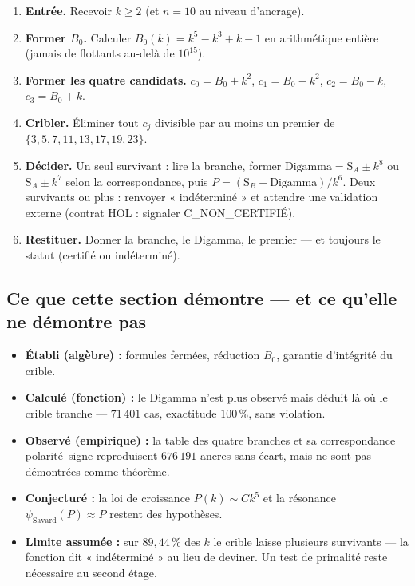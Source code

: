 \documentclass[11pt,a4paper]{article}
\newcommand{\SA}{\mathrm{S}_A}
\newcommand{\SB}{\mathrm{S}_B}
\begin{document}
\begin{enumerate}[leftmargin=*]
  \item \textbf{Entrée.} Recevoir $k \ge 2$ (et $n = 10$ au niveau d'ancrage).
  \item \textbf{Former $B_0$.} Calculer $B_0(k) = k^5-k^3+k-1$ en
    arithmétique entière (jamais de flottants au-delà de $10^{15}$).
  \item \textbf{Former les quatre candidats.}
    $c_0 = B_0+k^2$, $c_1 = B_0-k^2$, $c_2 = B_0-k$, $c_3 = B_0+k$.
  \item \textbf{Cribler.} Éliminer tout $c_j$ divisible par au moins un
    premier de $\{3,5,7,11,13,17,19,23\}$.
  \item \textbf{Décider.} Un seul survivant : lire la branche, former
    $\mathrm{Digamma} = \SA \pm k^8$ ou $\SA \pm k^7$ selon la
    correspondance, puis $P = (\SB-\mathrm{Digamma})/k^6$.
    Deux survivants ou plus : renvoyer « indéterminé » et attendre une
    validation externe (contrat HOL : signaler \textsc{C\_NON\_CERTIFIÉ}).
  \item \textbf{Restituer.} Donner la branche, le Digamma, le premier ---
    et toujours le statut (certifié ou indéterminé).
\end{enumerate}

\subsection{Ce que cette section démontre --- et ce qu'elle ne démontre pas}

\vspace{0.3cm}
\begin{boitealerte}
\begin{itemize}[nosep,leftmargin=*]
  \item \textbf{Établi (algèbre) :} formules fermées, réduction $B_0$,
    garantie d'intégrité du crible.
  \item \textbf{Calculé (fonction) :} le Digamma n'est plus observé mais
    déduit là où le crible tranche --- $71\,401$ cas, exactitude $100\,\%$,
    sans violation.
  \item \textbf{Observé (empirique) :} la table des quatre branches et sa
    correspondance polarité--signe reproduisent $676\,191$ ancres sans
    écart, mais ne sont pas démontrées comme théorème.
  \item \textbf{Conjecturé :} la loi de croissance $P(k) \sim Ck^5$ et la
    résonance $\psi_{\mathrm{Savard}}(P) \approx P$ restent des hypothèses.
  \item \textbf{Limite assumée :} sur $89{,}44\,\%$ des $k$ le crible laisse
    plusieurs survivants --- la fonction dit « indéterminé » au lieu de
    deviner. Un test de primalité reste nécessaire au second étage.
\end{itemize}
\end{boitealerte}
\end{document}
